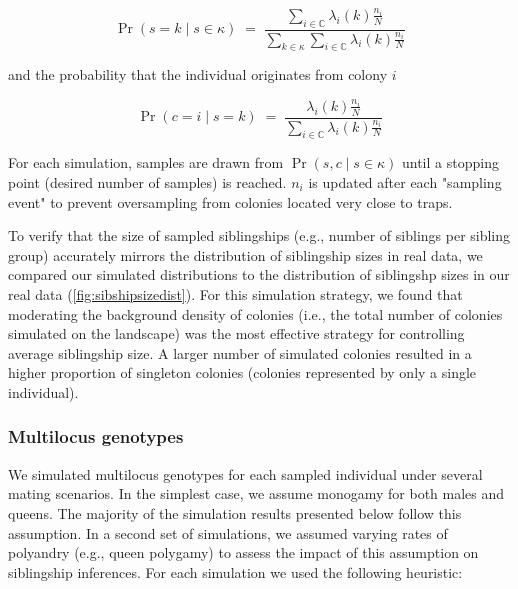 \documentclass[12pt]{article}
\begin{document}

\[
\Pr(s = k \mid s \in \kappa) \;=\; \frac{\sum_{i \in \mathbb{C}} \lambda_i(k) \frac{n_i}{N}}{\sum_{k \in \kappa} \sum_{i \in \mathbb{C}} \lambda_i(k) \frac{n_i}{N}}
\]

and the probability that the individual originates from colony $i$


\[
\Pr(c = i \mid s = k) \;=\; \frac{\lambda_i(k) \frac{n_i}{N}}{\sum_{i \in \mathbb{C}} \lambda_i(k) \frac{n_i}{N}}
\]

For each simulation, samples are drawn from $\Pr(s, c \mid s \in \kappa)$ until a stopping point (desired number of samples) is reached. $n_i$ is updated after each "sampling event" to prevent oversampling from colonies located very close to traps.

To verify that the size of sampled siblingships (e.g., number of siblings per sibling group) accurately mirrors the distribution of siblingship sizes in real data, we compared our simulated distributions to the distribution of siblingshp sizes in our real data (\ref{fig:sibshipsizedist}). For this simulation strategy, we found that moderating the background density of colonies (i.e., the total number of colonies simulated on the landscape) was the most effective strategy for controlling average siblingship size. A larger number of simulated colonies resulted in a higher proportion of singleton colonies (colonies represented by only a single individual).



\subsubsection{Multilocus genotypes}
We simulated multilocus genotypes for each sampled individual under several mating scenarios. In the simplest case, we assume monogamy for both males and queens. The majority of the simulation results presented below follow this assumption. In a second set of simulations, we assumed varying rates of polyandry (e.g., queen polygamy) to assess the impact of this assumption on siblingship inferences. For each simulation we used the following heuristic:
\end{document}
